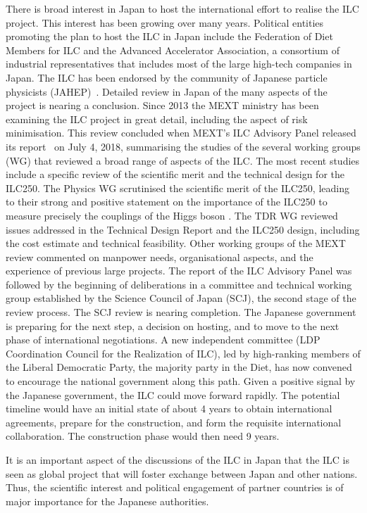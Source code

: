 There is broad interest in Japan to host the
international effort to realise the ILC project.  
This interest has been growing over many years.
Political entities promoting the plan to host the ILC in Japan include 
the Federation of Diet Members for ILC and the Advanced Accelerator
Association, a consortium of industrial representatives that includes
most of the large high-tech companies in Japan.   The ILC has been
endorsed by the community of Japanese particle physicists (JAHEP)~\cite{Asai:2017pwp}. 
Detailed review in Japan of the many aspects of the
project is nearing a conclusion.
Since 2013 the MEXT ministry has been examining the ILC project in
great detail, including the aspect of risk minimisation.
This review concluded when
MEXT's ILC Advisory Panel released 
its report~\cite{AdvPanel} on July 4, 2018, summarising the
studies of the several working groups (WG) that
reviewed 
a broad range of aspects of the ILC.  The most recent studies include
a specific review of the scientific merit and the technical design for the ILC250. 
The  Physics WG scrutinised the scientific merit of the ILC250,
leading to their strong and positive statement on the importance of
the ILC250 to 
measure precisely the couplings of the Higgs boson \cite{AdvPanel}.
The TDR WG reviewed issues addressed in the Technical Design Report
and the ILC250 design, including the  cost estimate and technical feasibility.  
Other working groups of the MEXT review commented on manpower needs, 
organisational aspects, and the experience of previous large projects.
The report of the ILC Advisory Panel was followed by the beginning of
deliberations in a committee and technical working group 
established by the Science Council of Japan (SCJ),
the second stage of the review process. 
The SCJ review is nearing completion.
  The Japanese government is preparing for the next step,
a decision on hosting, and to move to the next phase of international
negotiations.  A new  independent committee (LDP Coordination Council
for the Realization of ILC),
led by high-ranking members of the Liberal Democratic 
Party, the majority party in the Diet,  has now 
convened to encourage the national government along this path.
Given a positive signal by the Japanese government, the ILC could move 
forward rapidly.
The potential timeline would have an initial state of 
about 4 years to obtain
 international agreements, prepare for the  construction, and form 
 the requisite international
collaboration.  The construction phase would then need 9 years.


It is an important aspect of the discussions of the ILC in Japan that the
ILC is seen as global project that will foster exchange between Japan
and other nations.   Thus, the  
scientific interest and political engagement of partner countries is of
major importance
for the Japanese authorities.  

